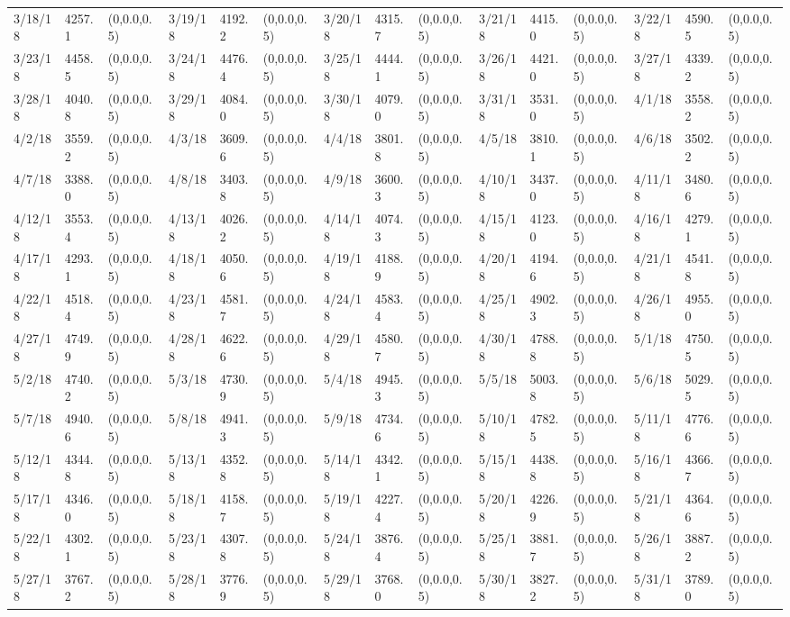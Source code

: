 \documentclass[12pt]{article}
\begin{document}
\begin{table}
\begin{center}
\begin{tabular}{p{15pt}p{15pt}p{25pt}p{15pt}p{15pt}p{25pt}p{15pt}p{15pt}p{25pt}p{15pt}p{15pt}p{25pt}p{15pt}p{15pt}p{25pt}}
        3/18/18&4257.1&(0,0.0,0.5)&3/19/18&4192.2&(0,0.0,0.5)&3/20/18&4315.7&(0,0.0,0.5)&3/21/18&4415.0&(0,0.0,0.5)&3/22/18&4590.5&(0,0.0,0.5)\\
        3/23/18&4458.5&(0,0.0,0.5)&3/24/18&4476.4&(0,0.0,0.5)&3/25/18&4444.1&(0,0.0,0.5)&3/26/18&4421.0&(0,0.0,0.5)&3/27/18&4339.2&(0,0.0,0.5)\\
        3/28/18&4040.8&(0,0.0,0.5)&3/29/18&4084.0&(0,0.0,0.5)&3/30/18&4079.0&(0,0.0,0.5)&3/31/18&3531.0&(0,0.0,0.5)&4/1/18&3558.2&(0,0.0,0.5)\\
        4/2/18&3559.2&(0,0.0,0.5)&4/3/18&3609.6&(0,0.0,0.5)&4/4/18&3801.8&(0,0.0,0.5)&4/5/18&3810.1&(0,0.0,0.5)&4/6/18&3502.2&(0,0.0,0.5)\\
        4/7/18&3388.0&(0,0.0,0.5)&4/8/18&3403.8&(0,0.0,0.5)&4/9/18&3600.3&(0,0.0,0.5)&4/10/18&3437.0&(0,0.0,0.5)&4/11/18&3480.6&(0,0.0,0.5)\\
        4/12/18&3553.4&(0,0.0,0.5)&4/13/18&4026.2&(0,0.0,0.5)&4/14/18&4074.3&(0,0.0,0.5)&4/15/18&4123.0&(0,0.0,0.5)&4/16/18&4279.1&(0,0.0,0.5)\\
        4/17/18&4293.1&(0,0.0,0.5)&4/18/18&4050.6&(0,0.0,0.5)&4/19/18&4188.9&(0,0.0,0.5)&4/20/18&4194.6&(0,0.0,0.5)&4/21/18&4541.8&(0,0.0,0.5)\\
        4/22/18&4518.4&(0,0.0,0.5)&4/23/18&4581.7&(0,0.0,0.5)&4/24/18&4583.4&(0,0.0,0.5)&4/25/18&4902.3&(0,0.0,0.5)&4/26/18&4955.0&(0,0.0,0.5)\\
        4/27/18&4749.9&(0,0.0,0.5)&4/28/18&4622.6&(0,0.0,0.5)&4/29/18&4580.7&(0,0.0,0.5)&4/30/18&4788.8&(0,0.0,0.5)&5/1/18&4750.5&(0,0.0,0.5)\\
        5/2/18&4740.2&(0,0.0,0.5)&5/3/18&4730.9&(0,0.0,0.5)&5/4/18&4945.3&(0,0.0,0.5)&5/5/18&5003.8&(0,0.0,0.5)&5/6/18&5029.5&(0,0.0,0.5)\\
        5/7/18&4940.6&(0,0.0,0.5)&5/8/18&4941.3&(0,0.0,0.5)&5/9/18&4734.6&(0,0.0,0.5)&5/10/18&4782.5&(0,0.0,0.5)&5/11/18&4776.6&(0,0.0,0.5)\\
        5/12/18&4344.8&(0,0.0,0.5)&5/13/18&4352.8&(0,0.0,0.5)&5/14/18&4342.1&(0,0.0,0.5)&5/15/18&4438.8&(0,0.0,0.5)&5/16/18&4366.7&(0,0.0,0.5)\\
        5/17/18&4346.0&(0,0.0,0.5)&5/18/18&4158.7&(0,0.0,0.5)&5/19/18&4227.4&(0,0.0,0.5)&5/20/18&4226.9&(0,0.0,0.5)&5/21/18&4364.6&(0,0.0,0.5)\\
        5/22/18&4302.1&(0,0.0,0.5)&5/23/18&4307.8&(0,0.0,0.5)&5/24/18&3876.4&(0,0.0,0.5)&5/25/18&3881.7&(0,0.0,0.5)&5/26/18&3887.2&(0,0.0,0.5)\\
        5/27/18&3767.2&(0,0.0,0.5)&5/28/18&3776.9&(0,0.0,0.5)&5/29/18&3768.0&(0,0.0,0.5)&5/30/18&3827.2&(0,0.0,0.5)&5/31/18&3789.0&(0,0.0,0.5)\\

\end{tabular}
\end{center}
\end{table}
\end{document}
